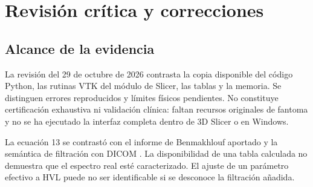 \chapter{Revisión crítica y correcciones}
\label{chap:auditoria}
\section{Alcance de la evidencia}
La revisión del 29 de octubre de 2026 contrasta la copia disponible del código Python, las rutinas VTK del módulo de Slicer, las tablas y la memoria. Se distinguen errores reproducidos y límites físicos pendientes. No constituye certificación exhaustiva ni validación clínica: faltan recursos originales de fantoma y no se ha ejecutado la interfaz completa dentro de 3D Slicer o en Windows.

La ecuación 13 se contrastó con el informe de Benmakhlouf aportado y la semántica de filtración con DICOM \citep{benreport,dicomfilters}. La disponibilidad de una tabla calculada no demuestra que el espectro real esté caracterizado. El ajuste de un parámetro efectivo a HVL puede no ser identificable si se desconoce la filtración añadida.

